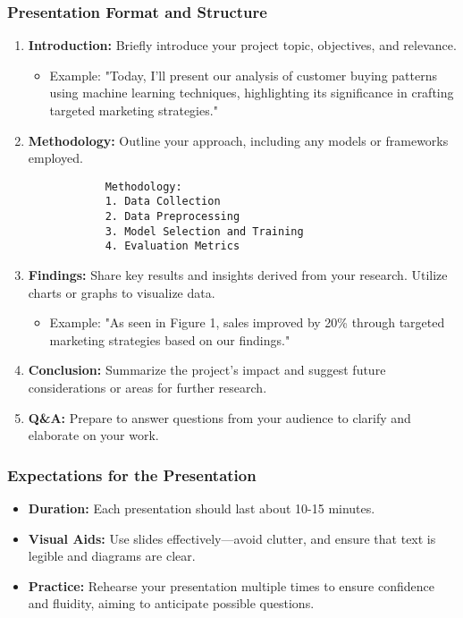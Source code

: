 \documentclass[aspectratio=169]{beamer}
\begin{document}
\begin{frame}[fragile]
    \frametitle{Presentation Format and Structure}
    \begin{enumerate}
        \item \textbf{Introduction:} Briefly introduce your project topic, objectives, and relevance.
            \begin{itemize}
                \item Example: "Today, I'll present our analysis of customer buying patterns using machine learning techniques, highlighting its significance in crafting targeted marketing strategies."
            \end{itemize}
        \item \textbf{Methodology:} Outline your approach, including any models or frameworks employed.
            \begin{lstlisting}
            Methodology:
            1. Data Collection
            2. Data Preprocessing
            3. Model Selection and Training
            4. Evaluation Metrics
            \end{lstlisting}
        \item \textbf{Findings:} Share key results and insights derived from your research. Utilize charts or graphs to visualize data.
            \begin{itemize}
                \item Example: "As seen in Figure 1, sales improved by 20\% through targeted marketing strategies based on our findings."
            \end{itemize}
        \item \textbf{Conclusion:} Summarize the project's impact and suggest future considerations or areas for further research.
        \item \textbf{Q\&A:} Prepare to answer questions from your audience to clarify and elaborate on your work.
    \end{enumerate}
\end{frame}

\begin{frame}[fragile]
    \frametitle{Expectations for the Presentation}
    \begin{itemize}
        \item \textbf{Duration:} Each presentation should last about 10-15 minutes.
        \item \textbf{Visual Aids:} Use slides effectively—avoid clutter, and ensure that text is legible and diagrams are clear.
        \item \textbf{Practice:} Rehearse your presentation multiple times to ensure confidence and fluidity, aiming to anticipate possible questions.
    \end{itemize}
\end{frame}
\end{document}
